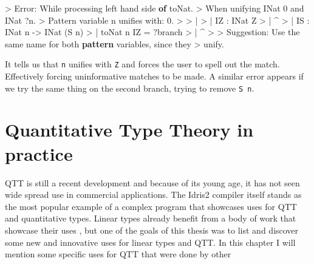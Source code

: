 \documentclass[
]{article}
\newenvironment{Shaded}{}{}
\newcommand{\DataTypeTok}[1]{\textcolor[rgb]{0.56,0.13,0.00}{#1}}
\newcommand{\DecValTok}[1]{\textcolor[rgb]{0.25,0.63,0.44}{#1}}
\newcommand{\FunctionTok}[1]{\textcolor[rgb]{0.02,0.16,0.49}{#1}}
\newcommand{\KeywordTok}[1]{\textcolor[rgb]{0.00,0.44,0.13}{\textbf{#1}}}
\newcommand{\NormalTok}[1]{#1}
\newcommand{\OperatorTok}[1]{\textcolor[rgb]{0.40,0.40,0.40}{#1}}
\newcommand{\OtherTok}[1]{\textcolor[rgb]{0.00,0.44,0.13}{#1}}
\begin{document}
\begin{Shaded}
\begin{Highlighting}[]
\OperatorTok{\textgreater{}} \DataTypeTok{Error}\OperatorTok{:} \DataTypeTok{While}\NormalTok{ processing left hand side }\KeywordTok{of}\NormalTok{ toNat}\OperatorTok{.} 
\OperatorTok{\textgreater{}}   \DataTypeTok{When}\NormalTok{ unifying }\DataTypeTok{INat} \DecValTok{0} \FunctionTok{and} \DataTypeTok{INat} \OperatorTok{?}\NormalTok{n}\OperatorTok{.}
\OperatorTok{\textgreater{}} \DataTypeTok{Pattern}\NormalTok{ variable n unifies with}\OperatorTok{:} \DecValTok{0}\OperatorTok{.}
\OperatorTok{\textgreater{}} 
\OperatorTok{\textgreater{}}     \OperatorTok{|}
\OperatorTok{\textgreater{}}     \OperatorTok{|}   \DataTypeTok{IZ} \OperatorTok{:} \DataTypeTok{INat} \DataTypeTok{Z}
\OperatorTok{\textgreater{}}     \OperatorTok{|}             \OperatorTok{\^{}}
\OperatorTok{\textgreater{}}     \OperatorTok{|}   \DataTypeTok{IS} \OperatorTok{:} \DataTypeTok{INat}\NormalTok{ n }\OtherTok{{-}\textgreater{}} \DataTypeTok{INat}\NormalTok{ (}\DataTypeTok{S}\NormalTok{ n)}
\OperatorTok{\textgreater{}}     \OperatorTok{|}\NormalTok{  toNat n }\DataTypeTok{IZ} \OtherTok{=} \OperatorTok{?}\NormalTok{branch}
\OperatorTok{\textgreater{}}     \OperatorTok{|}        \OperatorTok{\^{}}
\OperatorTok{\textgreater{}} 
\OperatorTok{\textgreater{}} \DataTypeTok{Suggestion}\OperatorTok{:} \DataTypeTok{Use}\NormalTok{ the same name for both }\KeywordTok{pattern}\NormalTok{ variables, since they }
\OperatorTok{\textgreater{}}\NormalTok{   unify}\OperatorTok{.}
\end{Highlighting}
\end{Shaded}

It tells us that \texttt{n} unifies with \texttt{Z} and forces the user
to spell out the match. Effectively forcing uninformative matches to be
made. A similar error appears if we try the same thing on the second
branch, trying to remove \texttt{S\ n}.

\newpage

\hypertarget{quantitative-type-theory-in-practice}{%
\section{Quantitative Type Theory in
practice}\label{quantitative-type-theory-in-practice}}

QTT is still a recent development and because of its young age, it has
not seen wide spread use in commercial applications. The Idris2 compiler
itself stands as the most popular example of a complex program that
showcases uses for QTT and quantitative types. Linear types already
benefit from a body of work that showcase their uses
\cite{linear_diff}\cite{linear_types_update}\cite{linear_types_session}\cite{linear_types_subst}\cite{actor_channels}\cite{linear_race}\cite{linear_use}\cite{once_upon_a_type}\cite{deforestation},
but one of the goals of this thesis was to list and discover some new
and innovative uses for linear types and QTT. In this chapter I will
mention some specific uses for QTT that were done by other
\end{document}
